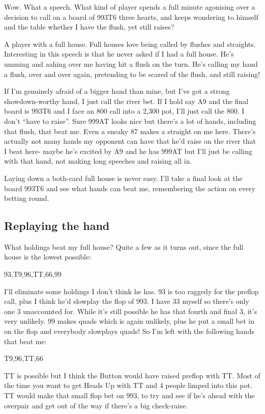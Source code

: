 Wow. What a speech. What kind of player spends a full minute agonising
over a decision to call on a board of 993T6 three hearts, and keeps
wondering to himself and the table whether I have the flush, yet still
raises?

A player with a full house. Full houses love being called by flushes
and straights. Interesting in this speech is that he never asked
if I had a full house. He's umming and aahing over me having
hit a flush on the turn. He's calling my hand a flush, over and over
again, pretending to be scared of the flush, and still raising!

If I'm genuinely afraid of a bigger hand than mine, but I've
got a strong showdown-worthy hand, I just call the river bet.
If I hold say A9 and the final board is 993T6 and I face an 800 call into
a 2,300 pot, I'll just call the 800. I don't ``have to raise''. Sure 999AT
looks nice but there's a lot of hands, including that flush, that beat me.
Even a sneaky 87 makes a straight on me here. There's actually not many
hands my opponent can have that he'd raise on the river that I beat here- maybe
he's excited by A9 and he has 999AT but I'll just be calling with that hand,
not making long speeches and raising all in.

Laying down a both-card full house is never easy. I'll take a final look
at the board 993T6 and see what hands can beat me, remembering the
action on every betting round.

\subsection{Replaying the hand}

What holdings beat my full house? Quite a few as it turns out, since
the full house is the lowest possible:

93,T9,96,TT,66,99

I'll eliminate some holdings I don't think he has. 93 is too raggedy
for the preflop call, plus I think he'd slowplay the flop of 993.
I have 33 myself so there's only one 3 unaccounted for. While it's
still possible he has that fourth and final 3, it's very unlikely.
99 makes quads which is again unlikely, plus he put a small bet in
on the flop and everybody slowplays quads! So I'm left with the following
hands that beat me:

T9,96,TT,66

TT is possible but I think the Button would have raised preflop with TT.
Most of the time you want to get Heads Up with TT and 4 people limped
into this pot. TT would make that small flop bet on 993, to try and see
if he's ahead with the overpair and get out of the way if there's a big
check-raise.


